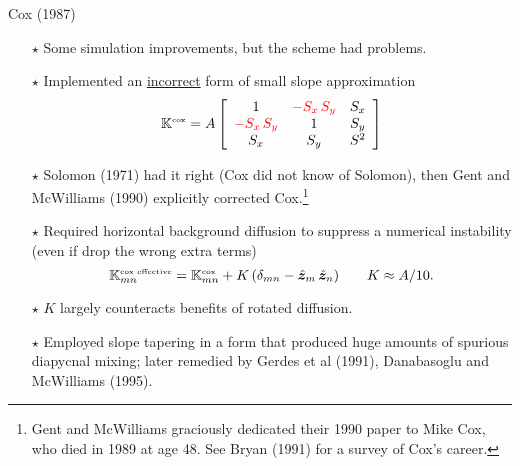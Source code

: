 \documentclass{beamer}
\begin{document}
\begin{frame}{Cox (1987)}

\begin{itemize}
    \item[$\star$]  Some simulation improvements, but the scheme had problems.
    \item[$\star$] Implemented an \underline{incorrect} form of small slope approximation
\begin{equation}
    \mathbb{K}^{\mbox{\tiny cox}} = 
    A \left[
    \begin{array}{ccc} 
    1  & \color{red} -S_{x} \, S_{y} \color{black}  & S_{x} \\
    \color{red}  -S_{x} \, S_{y} \color{black} & 1 & S_{y}   \\
    S_{x}  & S_{y} & S^{2}
    \end{array}
   \right]
   \end{equation}    
   
   \item[$\star$]  Solomon (1971) had it right (Cox did not know of Solomon), then Gent and McWilliams (1990) explicitly corrected Cox.\footnote{Gent and McWilliams  graciously dedicated their 1990 paper to Mike Cox, who died in 1989 at age 48. See Bryan (1991) for a survey of Cox's career.}
    
    \item[$\star$] Required horizontal background diffusion to suppress a numerical instability (even if drop \color{red} the wrong extra \color{black} terms)
\begin{equation}
    \mathbb{K}^{\mbox{\tiny cox effective}}_{mn} = 
    \mathbb{K}^{\mbox{\tiny cox}}_{mn}
    + K \, (\delta_{mn} - \hat{\bm z}_{m} \, \hat{\bm z}_{n}) \qquad 
    K \approx A/10.
   \end{equation}     
    
    \item[$\star$] $K$ largely counteracts benefits of rotated diffusion. 
    \item[$\star$] Employed slope tapering in a form that produced huge amounts of spurious diapycnal mixing; later remedied by Gerdes et al (1991), Danabasoglu and McWilliams (1995).
\end{itemize}



\end{frame}
\end{document}
